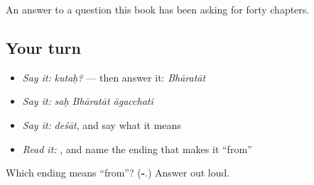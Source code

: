 \begin{grammarlens}[title={What you've built}]
An answer to a question this book has been asking for forty chapters.
\end{grammarlens}

\subsection*{Your turn}
\begin{itemize}
\raggedright
  \item \emph{Say it:} \emph{kutaḥ?} — then answer it: \emph{Bhāratāt}
  \item \emph{Say it:} \emph{saḥ Bhāratāt āgacchati}
  \item \emph{Say it:} \emph{deśāt}, and say what it means
  \item \emph{Read it:} \textbf{}, and name the ending that makes it \textquotedblleft{}from\textquotedblright{}
\end{itemize}

\begin{tcolorbox}[breakable,colback=teal!4,colframe=teal!35!black,title={Before you move on}]
Which ending means \textquotedblleft{}from\textquotedblright{}? (\textbf{-}.) Answer \textbf{} out loud.
\end{tcolorbox}

